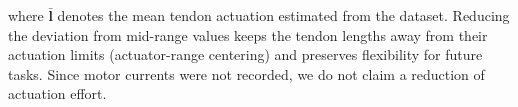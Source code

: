 where $\bar{\mathbf{l}}$ denotes the mean tendon actuation estimated from the dataset. Reducing the deviation from mid-range values keeps the tendon lengths away from their actuation limits (actuator-range centering) and preserves flexibility for future tasks. Since motor currents were not recorded, we do not claim a reduction of actuation effort.
